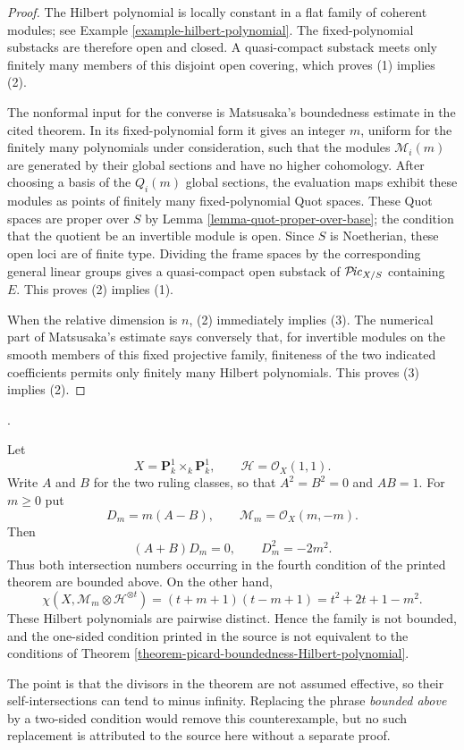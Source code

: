 \begin{proof}
The Hilbert polynomial is locally constant in a flat family of coherent
modules; see Example \ref{example-hilbert-polynomial}. The fixed-polynomial
substacks are therefore open and closed. A quasi-compact substack meets only
finitely many members of this disjoint open covering, which proves (1)
implies (2).

The nonformal input for the converse is Matsusaka's boundedness estimate in
the cited theorem. In its fixed-polynomial form it gives an integer $m$,
uniform for the finitely many polynomials under consideration, such that the
modules $\mathcal{M}_i(m)$ are generated by their global sections and have no
higher cohomology. After choosing a basis of the $Q_i(m)$ global sections,
the evaluation maps exhibit these modules as points of finitely many
fixed-polynomial Quot spaces. These Quot spaces are proper over $S$ by Lemma
\ref{lemma-quot-proper-over-base}; the condition that the quotient be an
invertible module is open. Since $S$ is Noetherian, these open loci are of
finite type. Dividing the frame spaces by the corresponding general linear
groups gives a quasi-compact open substack of $\mathcal{P}\!\mathit{ic}_{X/S}$ containing
$E$. This proves (2) implies (1).

When the relative dimension is $n$, (2) immediately implies (3). The
numerical part of Matsusaka's estimate says conversely that, for invertible
modules on the smooth members of this fixed projective family, finiteness of
the two indicated coefficients permits only finitely many Hilbert
polynomials. This proves (3) implies (2).
\end{proof}

\begin{example}
\label{example-picard-one-sided-intersection-bound}
\begin{reference}
\cite[Expos\'e 236, Theorem 4.1, condition $b''$, p. 243]{FGA}.
\end{reference}
Let
$$
X=\mathbf{P}^1_k\times_k\mathbf{P}^1_k,
\qquad \mathcal{H}=\mathcal{O}_X(1,1).
$$
Write $A$ and $B$ for the two ruling classes, so that
$A^2=B^2=0$ and $A B=1$. For $m\geq 0$ put
$$
D_m=m(A-B),\qquad \mathcal{M}_m=\mathcal{O}_X(m,-m).
$$
Then
\begin{equation}
\label{equation-picard-one-sided-intersection-bound}
(A+B)D_m=0,
\qquad
D_m^2=-2m^2.
\end{equation}
Thus both intersection numbers occurring in the fourth condition of the
printed theorem are bounded above. On the other hand,
$$
\chi(X,\mathcal{M}_m\otimes\mathcal{H}^{\otimes t})
=(t+m+1)(t-m+1)=t^2+2t+1-m^2.
$$
These Hilbert polynomials are pairwise distinct. Hence the family is not
bounded, and the one-sided condition printed in the source is not equivalent
to the conditions of Theorem
\ref{theorem-picard-boundedness-Hilbert-polynomial}.

The point is that the divisors in the theorem are not assumed effective, so
their self-intersections can tend to minus infinity. Replacing the phrase
\emph{bounded above} by a two-sided condition would remove this
counterexample, but no such replacement is attributed to the source here
without a separate proof.
\end{example}

